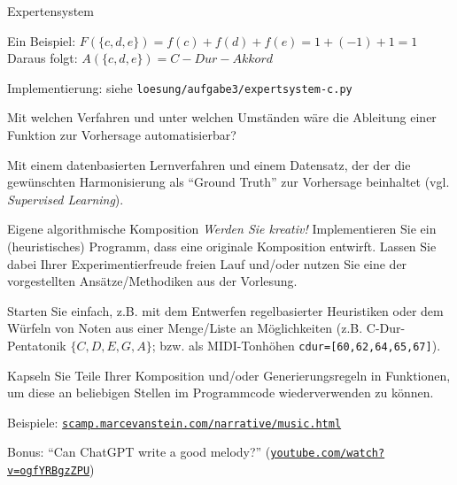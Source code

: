 \documentclass{uebungsblatt}
\begin{document}
\begin{aufgabe}{Expertensystem}
\begin{loesung}
		Ein Beispiel: $F(\{c,d,e\}) = f(c) + f(d) + f(e) = 1+(-1)+1 = 1$\\
		Daraus folgt: $A(\{c,d,e\}) = C-Dur-Akkord$
		
		\medskip
		Implementierung: siehe \texttt{loesung/aufgabe3/expertsystem-c.py}
	\end{loesung}
	\begin{teilaufgabe}
		Mit welchen Verfahren und unter welchen Umständen wäre die Ableitung einer Funktion zur Vorhersage automatisierbar?
	\end{teilaufgabe}
	\begin{loesung}
		Mit einem datenbasierten Lernverfahren und einem Datensatz, der der die gewünschten Harmonisierung als \enquote{Ground Truth} zur Vorhersage beinhaltet (vgl. \emph{Supervised Learning}).
	\end{loesung}
\end{aufgabe}

\begin{aufgabe}{Eigene algorithmische Komposition}
	\emph{Werden Sie kreativ!}
	Implementieren Sie ein (heuristisches) Programm, dass eine originale Komposition entwirft.
	Lassen Sie dabei Ihrer Experimentierfreude freien Lauf und/oder nutzen Sie eine der vorgestellten Ansätze/Methodiken aus der Vorlesung.
	\begin{tipp}
		Starten Sie einfach, z.B. mit dem Entwerfen regelbasierter Heuristiken oder dem Würfeln von Noten aus einer Menge/Liste an Möglichkeiten (z.B. C-Dur-Pentatonik $\{C,D,E,G,A\}$; bzw. als MIDI-Tonhöhen \texttt{cdur=[60,62,64,65,67]}).
	\end{tipp}
	\begin{tipp}
		Kapseln Sie Teile Ihrer Komposition und/oder Generierungsregeln in Funktionen, um diese an beliebigen Stellen im Programmcode wiederverwenden zu können.
	\end{tipp}
	\begin{loesung}
		Beispiele: \href{http://scamp.marcevanstein.com/narrative/music.html}{\texttt{scamp.marcevanstein.com/narrative/music.html}}
		
		Bonus: \enquote{Can ChatGPT write a good melody?} (\href{https://www.youtube.com/watch?v=ogfYRBgzZPU}{\texttt{youtube.com/watch?v=ogfYRBgzZPU}})
	\end{loesung}
\end{aufgabe}
	
\end{document}

